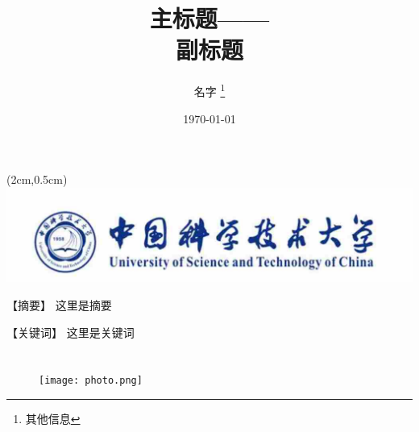 \documentclass[12pt, oneside, a4paper]{ctexart}
\title{\textbf{主标题—— \\ \large 副标题}}
\author{名字 \thanks{其他信息}}
\date{\today}
\begin{document}
\begin{textblock*}{10cm}(2cm,0.5cm) %
    \includegraphics[width=16cm]{beginning.jpg}
\end{textblock*}
\pagestyle{empty} %
\maketitle

\noindent
\begin{flushleft}
  \setlength{\parindent}{0pt}
  \small
  {\heiti【摘要】} 这里是摘要
  \par
  {\heiti【关键词】} 这里是关键词
  \normalsize
\end{flushleft}

\section{\textbf{}}

\begin{figure}[H]
  \centering
  \texttt{[image: photo.png]}
  \caption{}
  \label{fig:1}
\end{figure}


\end{document}
